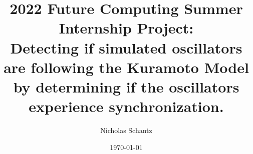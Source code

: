 \documentclass{article}
\begin{document}
    \begin{minipage}[h]{\textwidth}
        \title{2022 Future Computing Summer Internship Project:\\Detecting if simulated oscillators are following the Kuramoto Model by determining if the oscillators experience synchronization.}
        \author{Nicholas Schantz}
        \date{\today}
            \maketitle
        \begin{abstract}
        	

        \end{abstract}
    \end{minipage}

\ \\


\end{document}
